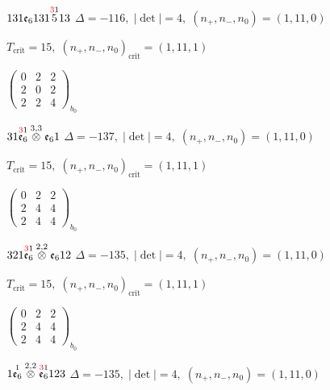 \documentclass[10pt]{article}
\begin{document}
$131\mathfrak{e}_6131\overset{\textcolor{red}{3}1}{5}13$ \quad $\Delta=-116,\; |\det|=4,\; (n_+,n_-,n_0)=(1,11,0)$

\hspace{1em}$T_{\text{crit}}=15,\; (n_+,n_-,n_0)_{\text{crit}}=(1,11,1)$

\hspace{2em}$\left(\begin{smallmatrix}0 & 2 & 2 \\ 2 & 0 & 2 \\ 2 & 2 & 4\end{smallmatrix}\right)_{\!b_0}$

\smallskip

$31\overset{\textcolor{red}{3}1}{\mathfrak{e}_6}\overset{3,3}{\otimes}\mathfrak{e}_61$ \quad $\Delta=-137,\; |\det|=4,\; (n_+,n_-,n_0)=(1,11,0)$

\hspace{1em}$T_{\text{crit}}=15,\; (n_+,n_-,n_0)_{\text{crit}}=(1,11,1)$

\hspace{2em}$\left(\begin{smallmatrix}0 & 2 & 2 \\ 2 & 4 & 4 \\ 2 & 4 & 4\end{smallmatrix}\right)_{\!b_0}$

\smallskip

$321\overset{\textcolor{red}{3}1}{\mathfrak{e}_6}\overset{2,2}{\otimes}\mathfrak{e}_612$ \quad $\Delta=-135,\; |\det|=4,\; (n_+,n_-,n_0)=(1,11,0)$

\hspace{1em}$T_{\text{crit}}=15,\; (n_+,n_-,n_0)_{\text{crit}}=(1,11,1)$

\hspace{2em}$\left(\begin{smallmatrix}0 & 2 & 2 \\ 2 & 4 & 4 \\ 2 & 4 & 4\end{smallmatrix}\right)_{\!b_0}$

\smallskip

$1\overset{1}{\mathfrak{e}_6}\overset{2,2}{\otimes}\overset{\textcolor{red}{3}1}{\mathfrak{e}_6}123$ \quad $\Delta=-135,\; |\det|=4,\; (n_+,n_-,n_0)=(1,11,0)$
\end{document}
